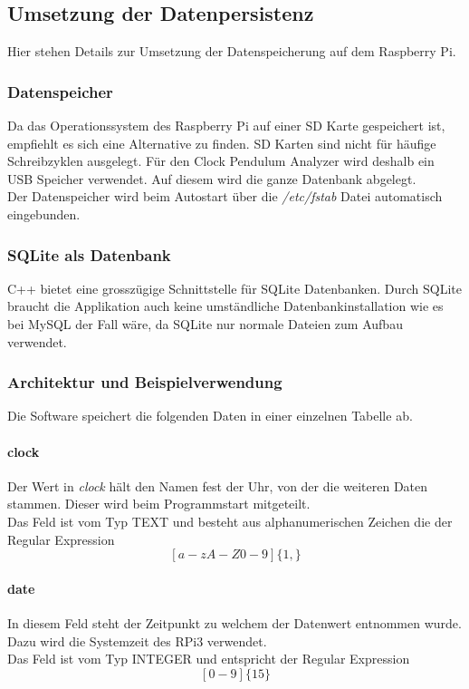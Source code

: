 \subsection{Umsetzung der Datenpersistenz}
    Hier stehen Details zur Umsetzung der Datenspeicherung auf dem Raspberry Pi.
    \subsubsection{Datenspeicher}
    Da das Operationssystem des Raspberry Pi auf einer SD Karte gespeichert ist, empfiehlt es sich eine Alternative zu finden. SD Karten sind nicht für häufige Schreibzyklen ausgelegt. Für den Clock Pendulum Analyzer wird deshalb ein USB Speicher verwendet. Auf diesem wird die ganze Datenbank abgelegt.\\
    Der Datenspeicher wird beim Autostart über die \textit{/etc/fstab} Datei automatisch eingebunden.
    
    \subsubsection{SQLite als Datenbank}
    C++ bietet eine grosszügige Schnittstelle für SQLite Datenbanken. Durch SQLite braucht die Applikation auch keine umständliche Datenbankinstallation wie es bei MySQL der Fall wäre, da SQLite nur normale Dateien zum Aufbau verwendet.
    
    \subsubsection{Architektur und Beispielverwendung}
    Die Software speichert die folgenden Daten in einer einzelnen Tabelle ab.
    \paragraph{clock}
    Der Wert in \textit{clock} hält den Namen fest der Uhr, von der die weiteren Daten stammen. Dieser wird beim Programmstart mitgeteilt.\\
    Das Feld ist vom Typ TEXT und besteht aus alphanumerischen Zeichen die der Regular Expression $$[a-zA-Z0-9]\{1,\}$$
    \paragraph{date}
    In diesem Feld steht der Zeitpunkt zu welchem der Datenwert entnommen wurde. Dazu wird die Systemzeit des RPi3 verwendet.\\
    Das Feld ist vom Typ INTEGER und entspricht der Regular Expression
    $$[0-9]\{15\}$$
